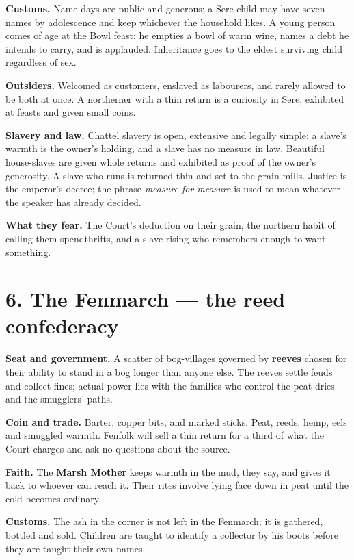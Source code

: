 \documentclass{design/chronicle}
\begin{document}
\textbf{Customs.} Name-days are public and generous; a Sere child may have seven names by adolescence and keep whichever the household likes. A young person comes of age at the Bowl feast: he empties a bowl of warm wine, names a debt he intends to carry, and is applauded. Inheritance goes to the eldest surviving child regardless of sex.

\textbf{Outsiders.} Welcomed as customers, enslaved as labourers, and rarely allowed to be both at once. A northerner with a thin return is a curiosity in Sere, exhibited at feasts and given small coins.

\textbf{Slavery and law.} Chattel slavery is open, extensive and legally simple: a slave’s warmth is the owner’s holding, and a slave has no measure in law. Beautiful house-slaves are given whole returns and exhibited as proof of the owner’s generosity. A slave who runs is returned thin and set to the grain mills. Justice is the emperor’s decree; the phrase \emph{measure for measure} is used to mean whatever the speaker has already decided.

\textbf{What they fear.} The Court’s deduction on their grain, the northern habit of calling them spendthrifts, and a slave rising who remembers enough to want something.

\section*{6. The Fenmarch — the reed confederacy}

\textbf{Seat and government.} A scatter of bog-villages governed by \textbf{reeves} chosen for their ability to stand in a bog longer than anyone else. The reeves settle feuds and collect fines; actual power lies with the families who control the peat-dries and the smugglers’ paths.

\textbf{Coin and trade.} Barter, copper bits, and marked sticks. Peat, reeds, hemp, eels and smuggled warmth. Fenfolk will sell a thin return for a third of what the Court charges and ask no questions about the source.

\textbf{Faith.} The \textbf{Marsh Mother} keeps warmth in the mud, they say, and gives it back to whoever can reach it. Their rites involve lying face down in peat until the cold becomes ordinary.

\textbf{Customs.} The ash in the corner is not left in the Fenmarch; it is gathered, bottled and sold. Children are taught to identify a collector by his boots before they are taught their own names.
\end{document}
